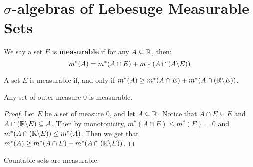 
\section{$\sigma$-algebras of Lebesuge Measurable Sets}

\begin{definition}
    We say a set $E$ is  \textbf{measurable} if for any $A \subseteq \mathbb{R}$, then:
    \begin{equation*}
        m^*(A)=m^*(A \cap E)+m*(A \cap (A \backslash E))
    \end{equation*}
\end{definition}

\begin{lemma}\label{8.2.1}
    A set $E$ is measurable if, and only if  $m^*(A) \geq m^*(A \cap E) +m^*(A
    \cap (\mathbb{R} \backslash E))$.
\end{lemma}

\begin{lemma}\label{8.2.2}
    Any set of outer measure $0$ is measurable.
\end{lemma}
\begin{proof}
    Let $E$ be a set of measure  $0$, and let  $A \subseteq \mathbb{R}$. Notice that  $A
    \cap E \subseteq E$ and  $A \cap (\mathbb{R} \backslash E) \subseteq A$. Then by
    monotonicity, $m^*(A \cap E) \leq m^*(E)=0$ and $m^*(A \cap (\mathbb{R} \backslash E))
    \leq m^*(A)$. Then we get that $m^*(A) \geq m^*(A \cap E)+m^*(A \cap
    (\mathbb{R} \backslash E))$.
\end{proof}
\begin{corollary}
    Countable sets are measurable.
\end{corollary}

